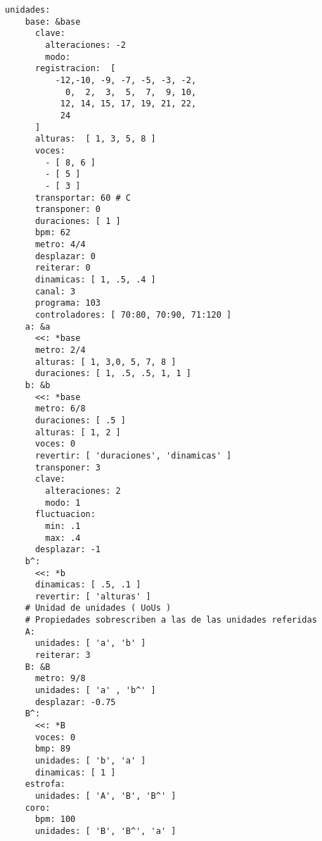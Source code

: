 \begin{itemize}
\begin{verbatim}
unidades:
    base: &base 
      clave:
        alteraciones: -2
        modo:
      registracion:  [ 
          -12,-10, -9, -7, -5, -3, -2,
            0,  2,  3,  5,  7,  9, 10,
           12, 14, 15, 17, 19, 21, 22,
           24
      ]
      alturas:  [ 1, 3, 5, 8 ] 
      voces: 
        - [ 8, 6 ] 
        - [ 5 ] 
        - [ 3 ]
      transportar: 60 # C
      transponer: 0
      duraciones: [ 1 ]
      bpm: 62
      metro: 4/4
      desplazar: 0
      reiterar: 0
      dinamicas: [ 1, .5, .4 ]
      canal: 3
      programa: 103
      controladores: [ 70:80, 70:90, 71:120 ]
    a: &a 
      <<: *base
      metro: 2/4
      alturas: [ 1, 3,0, 5, 7, 8 ]
      duraciones: [ 1, .5, .5, 1, 1 ]
    b: &b 
      <<: *base
      metro: 6/8
      duraciones: [ .5 ]
      alturas: [ 1, 2 ]
      voces: 0
      revertir: [ 'duraciones', 'dinamicas' ]
      transponer: 3
      clave: 
        alteraciones: 2
        modo: 1 
      fluctuacion: 
        min: .1
        max: .4 
      desplazar: -1
    b^: 
      <<: *b
      dinamicas: [ .5, .1 ]
      revertir: [ 'alturas' ]
    # Unidad de unidades ( UoUs )
    # Propiedades sobrescriben a las de las unidades referidas 
    A: 
      unidades: [ 'a', 'b' ] 
      reiterar: 3
    B: &B 
      metro: 9/8
      unidades: [ 'a' , 'b^' ]
      desplazar: -0.75
    B^: 
      <<: *B
      voces: 0 
      bmp: 89
      unidades: [ 'b', 'a' ] 
      dinamicas: [ 1 ]
    estrofa: 
      unidades: [ 'A', 'B', 'B^' ]
    coro: 
      bpm: 100
      unidades: [ 'B', 'B^', 'a' ]

\end{verbatim}


\end{itemize}
\setlength{\parskip}{6pt plus 2pt minus 1pt}